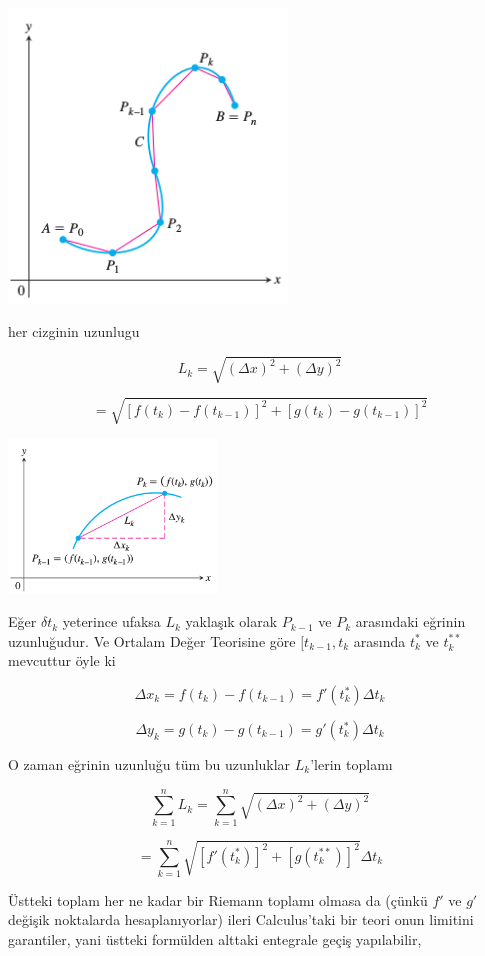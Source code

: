 \documentclass[12pt,fleqn]{article}\usepackage{../../common}
\begin{document}
\includegraphics[width=20em]{calc_multi_06_01.png}

her cizginin uzunlugu 

$$
L_k = \sqrt{(\Delta x)^2 + (\Delta y)^2}
$$

$$
= \sqrt{[f(t_k) - f(t_{k-1})]^2 + [g(t_k) - g(t_{k-1})]^2 }
$$

\includegraphics[width=15em]{calc_multi_06_03.png}

Eğer $\delta t_k$ yeterince ufaksa $L_k$ yaklaşık olarak $P_{k-1}$ ve $P_k$
arasındaki eğrinin uzunluğudur. Ve Ortalam Değer Teorisine göre
$[t_{k-1},t_k$ arasında $t_k^*$ ve $t_k^{**}$ mevcuttur öyle ki 

$$
\Delta x_k = f(t_k) - f(t_{k-1}) = f'(t_k^*) \Delta t_k
$$

$$
\Delta y_k = g(t_k) - g(t_{k-1}) = g'(t_k^*) \Delta t_k
$$

O zaman eğrinin uzunluğu tüm bu uzunluklar $L_k$'lerin toplamı 

$$
\sum _{k=1}^{n} L_k = \sum _{k=1}^{n} \sqrt{(\Delta x)^2 + (\Delta y)^2} 
$$

$$
= \sum _{k=1}^{n} \sqrt{[f'(t_k^*)]^2 + [g(t_k^{**})]^2} \Delta t_k
$$

Üstteki toplam her ne kadar bir Riemann toplamı olmasa da (çünkü $f'$ ve $g'$
değişik noktalarda hesaplanıyorlar) ileri Calculus'taki bir teori onun limitini
garantiler, yani üstteki formülden alttaki entegrale geçiş yapılabilir,
\end{document}

